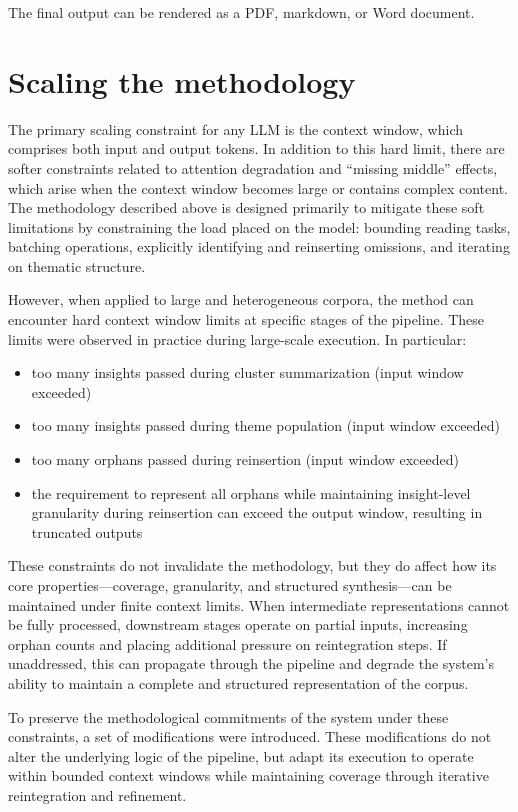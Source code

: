 \documentclass[
  11pt,
]{article}
\providecommand{\tightlist}{%
  \setlength{\itemsep}{0pt}\setlength{\parskip}{0pt}}
\begin{document}
The final output can be rendered as a PDF, markdown, or Word document.

\section{Scaling the methodology}\label{scaling-the-methodology}

The primary scaling constraint for any LLM is the context window, which
comprises both input and output tokens. In addition to this hard limit,
there are softer constraints related to attention degradation and
``missing middle'' effects, which arise when the context window becomes
large or contains complex content. The methodology described above is
designed primarily to mitigate these soft limitations by constraining
the load placed on the model: bounding reading tasks, batching
operations, explicitly identifying and reinserting omissions, and
iterating on thematic structure.

However, when applied to large and heterogeneous corpora, the method can
encounter hard context window limits at specific stages of the pipeline.
These limits were observed in practice during large-scale execution. In
particular:

\begin{itemize}
\tightlist
\item
  too many insights passed during cluster summarization (input window
  exceeded)
\item
  too many insights passed during theme population (input window
  exceeded)
\item
  too many orphans passed during reinsertion (input window exceeded)
\item
  the requirement to represent all orphans while maintaining
  insight-level granularity during reinsertion can exceed the output
  window, resulting in truncated outputs
\end{itemize}

These constraints do not invalidate the methodology, but they do affect
how its core properties---coverage, granularity, and structured
synthesis---can be maintained under finite context limits. When
intermediate representations cannot be fully processed, downstream
stages operate on partial inputs, increasing orphan counts and placing
additional pressure on reintegration steps. If unaddressed, this can
propagate through the pipeline and degrade the system's ability to
maintain a complete and structured representation of the corpus.

To preserve the methodological commitments of the system under these
constraints, a set of modifications were introduced. These modifications
do not alter the underlying logic of the pipeline, but adapt its
execution to operate within bounded context windows while maintaining
coverage through iterative reintegration and refinement.
\end{document}

